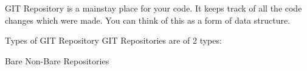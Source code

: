 
GIT Repository is a mainstay place for your code. It keeps track of all the code changes which were made. You can think of this as a form of data structure.

Types of GIT Repository
GIT Repositories are of 2 types:

Bare
Non-Bare Repositories
